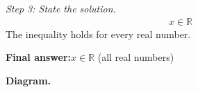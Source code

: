 \documentclass[11pt]{article}
\begin{document}
\textit{Step 3: State the solution.}
\[\begin{gathered}
x \in \mathbb{R}
\end{gathered}\]
The inequality holds for every real number.

\begin{answerbox}
\textbf{Final answer:}\quad \(\displaystyle x \in \mathbb{R}\) (all real numbers)
\end{answerbox}
\textbf{Diagram.}

\begin{center}
\end{center}
\end{document}
